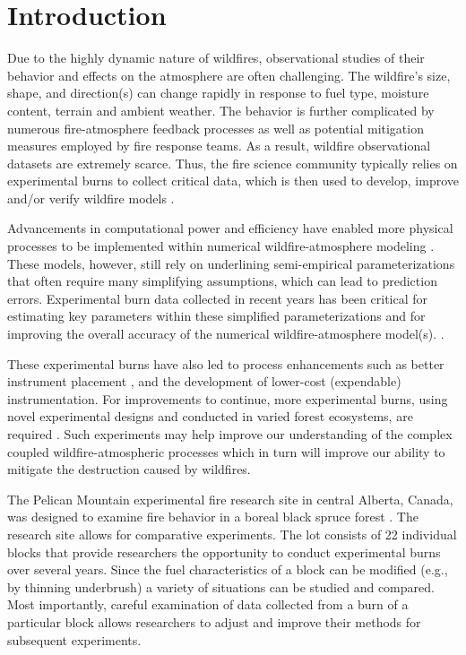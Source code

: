 \documentclass[preprints,article,accept,moreauthors,pdftex]{Definitions/mdpi}
\begin{document}
\section{Introduction}


Due to the highly dynamic nature of wildfires, observational studies of their behavior and effects on the atmosphere are often challenging. The wildfire's size, shape, and direction(s) can change rapidly in response to fuel type, moisture content, terrain and ambient weather. The behavior is further complicated by numerous fire-atmosphere feedback processes as well as potential mitigation measures employed by fire response teams. As a result, wildfire observational datasets are extremely scarce. Thus, the fire science community typically relies on experimental burns to collect critical data, which is then used to develop, improve and/or verify wildfire models \cite{mandel_coupled_2011,mandel_recent_2014,coen_requirements_2018}.

Advancements in computational power and efficiency have enabled more physical processes to be implemented within numerical wildfire-atmosphere modeling \cite{kochanski_experimental_2018}. These models, however, still rely on underlining semi-empirical parameterizations that often require many simplifying assumptions, which can lead to prediction errors. Experimental burn data collected in recent years \cite{butler_observations_2016,hudak_data_2014,hudak_data_2016,seto_csu_data_2016,seto_data_2016,hudak_data_2017,ottmar_data_2016,urbanski_data_2016} has been critical for estimating key parameters within these simplified parameterizations and for improving the overall accuracy of the numerical wildfire-atmosphere model(s). \cite{kochanski_experimental_2018,mallia_incorporating_2020,kochanski_evaluation_2013,coen_requirements_2018}.

These experimental burns have also led to process enhancements such as better instrument placement \cite{kochanski_experimental_2018}, and the development of lower-cost (expendable) instrumentation. For improvements to continue, more experimental burns, using novel experimental designs and conducted in varied forest ecosystems, are required \cite{mandel_recent_2014}. Such experiments may help improve our understanding of the complex coupled wildfire-atmospheric processes which in turn will improve our ability to mitigate the destruction caused by wildfires.

The Pelican Mountain experimental fire research site in central Alberta, Canada, was designed to examine fire behavior in a boreal black spruce forest \cite{thompson_recent_2020}. The research site allows for comparative experiments. The lot consists of 22 individual blocks that provide researchers the opportunity to conduct experimental burns over several years. Since the fuel characteristics of a block can be modified (e.g., by thinning underbrush) a variety of situations can be studied and compared. Most importantly, careful examination of data collected from a burn of a particular block allows researchers to adjust and improve their methods for subsequent experiments.
\end{document}
